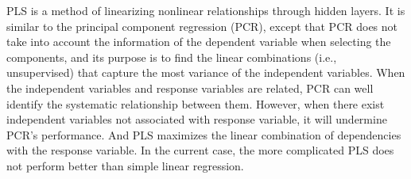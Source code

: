 \documentclass[12pt,]{krantz}
\newenvironment{Shaded}{\begin{snugshade}}{\end{snugshade}}
\newcommand{\KeywordTok}[1]{\textcolor[rgb]{0.13,0.29,0.53}{\textbf{{#1}}}}
\newcommand{\DataTypeTok}[1]{\textcolor[rgb]{0.13,0.29,0.53}{{#1}}}
\newcommand{\DecValTok}[1]{\textcolor[rgb]{0.00,0.00,0.81}{{#1}}}
\newcommand{\StringTok}[1]{\textcolor[rgb]{0.31,0.60,0.02}{{#1}}}
\newcommand{\CommentTok}[1]{\textcolor[rgb]{0.56,0.35,0.01}{\textit{{#1}}}}
\newcommand{\OtherTok}[1]{\textcolor[rgb]{0.56,0.35,0.01}{{#1}}}
\newcommand{\NormalTok}[1]{{#1}}
\theoremstyle{definition}
\theoremstyle{definition}
\theoremstyle{remark}
\begin{document}
PLS is a method of linearizing nonlinear relationships through hidden
layers. It is similar to the principal component regression (PCR),
except that PCR does not take into account the information of the
dependent variable when selecting the components, and its purpose is to
find the linear combinations (i.e., unsupervised) that capture the most
variance of the independent variables. When the independent variables
and response variables are related, PCR can well identify the systematic
relationship between them. However, when there exist independent
variables not associated with response variable, it will undermine PCR's
performance. And PLS maximizes the linear combination of dependencies
with the response variable. In the current case, the more complicated
PLS does not perform better than simple linear regression.

\begin{Shaded}
\end{Shaded}

\begin{Shaded}
\end{Shaded}
\end{document}
